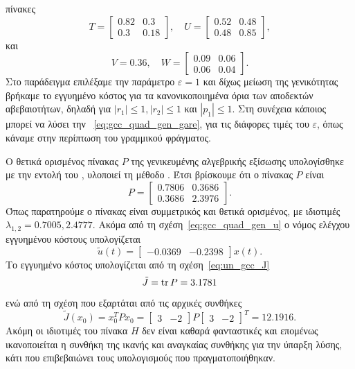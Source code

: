 πίνακες
\[
    T =
    \begin{bmatrix}
        0.82 & 0.3 \\
        0.3 & 0.18
    \end{bmatrix},\quad
    U =
    \begin{bmatrix}
        0.52 & 0.48 \\
        0.48 & 0.85
    \end{bmatrix},
\]
και
\[
    V = 0.36,\quad
    W =
    \begin{bmatrix}
        0.09 & 0.06 \\
        0.06 & 0.04
    \end{bmatrix}.
\]
Στο παράδειγμα επιλέξαμε την παράμετρο \( \varepsilon = 1 \) και δίχως μείωση της
γενικότητας βρήκαμε το εγγυημένο κόστος για τα κανονικοποιημένα όρια των αποδεκτών
αβεβαιοτήτων, δηλαδή για
\( |r_1| \leq 1 , |r_2| \leq 1 \) και \( |p_1| \leq 1 \). Στη συνέχεια κάποιος
μπορεί να λύσει την ~\eqref{eq:gcc_quad_gen_gare}, για τις διάφορες
τιμές του \( \varepsilon \), όπως κάναμε στην περίπτωση του γραμμικού φράγματος.

Ο θετικά ορισμένος πίνακας \( P \) της γενικευμένης αλγεβρικής εξίσωσης
 υπολογίσθηκε με την εντολή  του , υλοποιεί
τη μέθοδο . Έτσι βρίσκουμε ότι ο πίνακας \( P \) είναι
\[
    P =
    \begin{bmatrix}
        0.7806 & 0.3686 \\
        0.3686 & 2.3976
    \end{bmatrix}.
\]
Όπως παρατηρούμε ο πίνακας είναι συμμετρικός και θετικά ορισμένος, με ιδιοτιμές
\( \lambda_{1,2} = 0.7005, 2.4777 \). Ακόμα από τη σχέση~\eqref{eq:gcc_quad_gen_u}
ο νόμος ελέγχου εγγυημένου κόστους υπολογίζεται
\[
    \tilde{u}(t) =
    \begin{bmatrix}
        -0.0369 & -0.2398
    \end{bmatrix}x(t).
\]
Το εγγυημένο κόστος υπολογίζεται από τη σχέση~\eqref{eq:un_gcc_J}
\[
   \tilde{J} = \operatorname{tr}{P} = 3.1781
\]
ενώ από τη σχέση που εξαρτάται από τις αρχικές συνθήκες
\[
    \tilde{J}(x_0) = x_0^{T}Px_0 =
    \begin{bmatrix}
        3 & -2
    \end{bmatrix}P
    \begin{bmatrix}
        3 & -2
    \end{bmatrix}^T = 12.1916.
\]
Ακόμη οι ιδιοτιμές του πίνακα \( H \) δεν είναι καθαρά φανταστικές και επομένως
ικανοποιείται η συνθήκη της ικανής και αναγκαίας συνθήκης για την ύπαρξη λύσης,
κάτι που επιβεβαιώνει τους υπολογισμούς που πραγματοποιήθηκαν.

